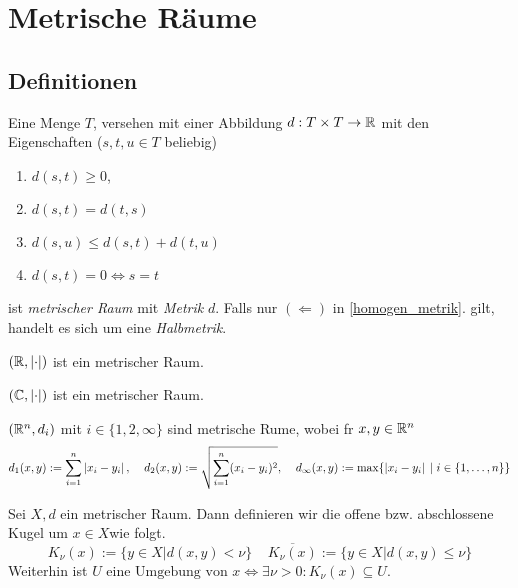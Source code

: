 \chapter{Metrische R\"aume}
\section{Definitionen}

\begin{definition} \label{def_metrik}
	Eine Menge $T$, versehen mit einer Abbildung \(d: T \times T \to \mathbb{R}\) mit den Eigenschaften (\(s,t,u \in T\) beliebig)
	\begin{enumerate}[noitemsep]
		\item \(d(s,t)\geq 0\),
		\item \(d(s,t) = d(t,s)\)
		\item \(d(s,u) \leq d(s,t) + d(t,u)\)
		\item \(d(s,t) = 0 \iff s = t\) \label{homogen_metrik}	\end{enumerate}
	ist \textit{metrischer Raum} mit \textit{Metrik} $d$. Falls nur $(\Leftarrow)$ in \ref{homogen_metrik}. gilt, handelt es sich um eine \textit{Halbmetrik}. 
\end{definition}

\begin{ex}
	\((\mathbb{R}, \left\lvert \cdot \right\rvert)\) ist ein metrischer Raum.
\end{ex}
\begin{ex}
\((\mathbb{C}, \left\lvert \cdot \right\rvert )\) ist ein metrischer Raum. 
\end{ex}
\begin{ex}
	\((\mathbb{R}^n, d_i)\) mit \(i \in \{1,2,\infty\}\) sind metrische R\as ume, wobei f\us r \(x,y \in \mathbb{R}^n\)
	\[d_1(x,y) := \sum_{i=1}^n  \left\lvert x_i -y_i  \right\rvert,\;\;\;\; d_2(x,y) := \sqrt{\sum_{i = 1}^n (x_i - y_i)^2}, \;\;\;\; d_\infty(x,y) := \max \{\left\lvert x_i - y_i \right\rvert\;\vert\; i\in \left\{1,\ldots, n\right\}\}\]
\end{ex}
\begin{definition}
	Sei \(X,d\) ein metrischer Raum. Dann definieren wir die offene bzw. abschlossene Kugel um \(x\in X\)wie folgt.
	\[K_\nu (x) := \{y \in X \vert d(x,y) < \nu\} \;\;\;\; \overline{K_\nu(x)} := \{y \in X \vert d(x,y) \leq \nu \}\]
	Weiterhin ist \(U \text{ eine Umgebung von } x \iff \exists \nu > 0: K_\nu(x) \subseteq U\).
\end{definition}

